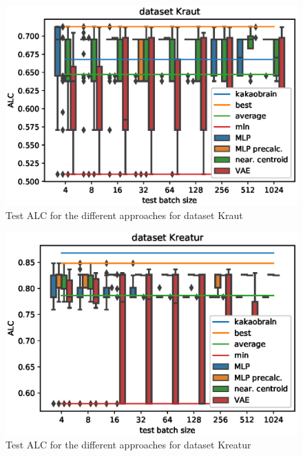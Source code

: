 \documentclass{article}
\begin{document}
\begin{figure}[H]
\begin{center}
 	\includegraphics[width=0.99\linewidth]{../figures/12.eps} 
\end{center}
\caption{Test ALC for the different approaches for dataset Kraut}
\label{fig:12}
\end{figure} 
%
\begin{figure}[H]
\begin{center}
 	\includegraphics[width=0.99\linewidth]{../figures/11.eps} 
\end{center}
\caption{Test ALC for the different approaches for dataset Kreatur}
\label{fig:11}
\end{figure} 
\end{document}
